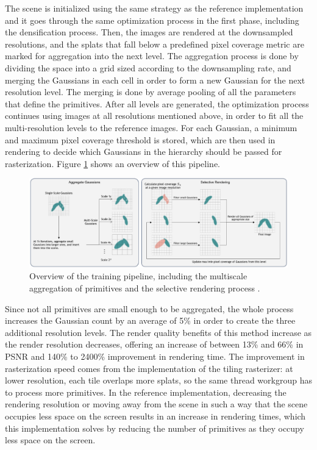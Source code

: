 The scene is initialized using the same strategy as the reference implementation and it goes through the same optimization process in the first phase, including the densification process. Then, the images are rendered at the downsampled resolutions, and the splats that fall below a predefined pixel coverage metric are marked for aggregation into the next level. The aggregation process is done by dividing the space into a grid sized according to the downsampling rate, and merging the Gaussians in each cell in order to form a new Gaussian for the next resolution level. The merging is done by average pooling of all the parameters that define the primitives. After all levels are generated, the optimization process continues using images at all resolutions mentioned above, in order to fit all the multi-resolution levels to the reference images.
For each Gaussian, a minimum and maximum pixel coverage threshold is stored, which are then used in rendering to decide which Gaussians in the hierarchy should be passed for rasterization. Figure \ref{fig:multiscale_aggregate} shows an overview of this pipeline.

\begin{figure}[H]
    \centering
    \includegraphics[width=0.8\linewidth]{figures/multiscale_gaussian.png}
    \caption{Overview of the training pipeline, including the multiscale aggregation of primitives and the selective rendering process \cite{yan2024multiscale3dgaussiansplatting}.}
    \label{fig:multiscale_aggregate}
\end{figure}

Since not all primitives are small enough to be aggregated, the whole process increases the Gaussian count by an average of 5\% in order to create the three additional resolution levels. The render quality benefits of this method increase as the render resolution decreases, offering an increase of between 13\% and 66\% in PSNR and 140\% to 2400\% improvement in rendering time. The improvement in rasterization speed comes from the implementation of the tiling rasterizer: at lower resolution, each tile overlaps more splats, so the same thread workgroup has to process more primitives. In the reference implementation, decreasing the rendering resolution or moving away from the scene in such a way that the scene occupies less space on the screen results in an increase in rendering times, which this implementation solves by reducing the number of primitives as they occupy less space on the screen. 

